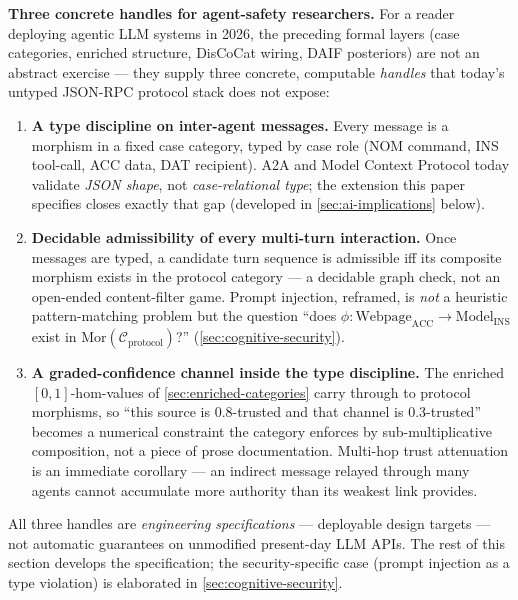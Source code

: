 \documentclass[
]{article}
\providecommand{\tightlist}{%
  \setlength{\itemsep}{0pt}\setlength{\parskip}{0pt}}
\begin{document}
\textbf{Three concrete handles for agent-safety researchers.} For a
reader deploying agentic LLM systems in 2026, the preceding formal
layers (case categories, enriched structure, DisCoCat wiring, DAIF
posteriors) are not an abstract exercise --- they supply three concrete,
computable \emph{handles} that today's untyped JSON-RPC protocol stack
does not expose:

\begin{enumerate}
\def\labelenumi{\arabic{enumi}.}
\tightlist
\item
  \textbf{A type discipline on inter-agent messages.} Every message is a
  morphism in a fixed case category, typed by case role (NOM command,
  INS tool-call, ACC data, DAT recipient). A2A \citep{google2025a2a} and
  Model Context Protocol \citep{anthropic2024mcp} today validate
  \emph{JSON shape}, not \emph{case-relational type}; the extension this
  paper specifies closes exactly that gap (developed in
  \autoref{sec:ai-implications} below).
\item
  \textbf{Decidable admissibility of every multi-turn interaction.} Once
  messages are typed, a candidate turn sequence is admissible iff its
  composite morphism exists in the protocol category --- a decidable
  graph check, not an open-ended content-filter game. Prompt injection,
  reframed, is \emph{not} a heuristic pattern-matching problem but the
  question ``does
  \(\phi \colon \text{Webpage}_{\text{ACC}} \to \text{Model}_{\text{INS}}\)
  exist in \(\text{Mor}(\mathcal{C}_{\text{protocol}})\)?''
  (\autoref{sec:cognitive-security}).
\item
  \textbf{A graded-confidence channel inside the type discipline.} The
  enriched \([0,1]\)-hom-values of \autoref{sec:enriched-categories}
  carry through to protocol morphisms, so ``this source is 0.8-trusted
  and that channel is 0.3-trusted'' becomes a numerical constraint the
  category enforces by sub-multiplicative composition, not a piece of
  prose documentation. Multi-hop trust attenuation is an immediate
  corollary --- an indirect message relayed through many agents cannot
  accumulate more authority than its weakest link provides.
\end{enumerate}

All three handles are \emph{engineering specifications} --- deployable
design targets --- not automatic guarantees on unmodified present-day
LLM APIs. The rest of this section develops the specification; the
security-specific case (prompt injection as a type violation) is
elaborated in \autoref{sec:cognitive-security}.
\end{document}
